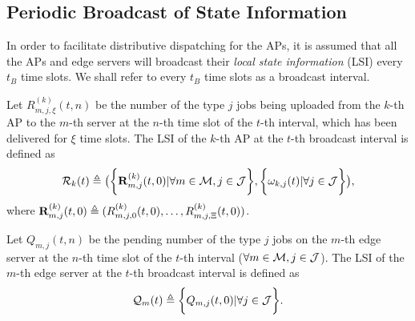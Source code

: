 \subsection{Periodic Broadcast of State Information}
\label{subsec:broadcast}
In order to facilitate distributive dispatching for the APs, it is assumed that all the APs and edge servers will broadcast their \emph{local state information} (LSI) every $t_B$ time slots.
We shall refer to every $t_B$ time slots as a broadcast interval.

\begin{definition}
    Let $R^{(k)}_{m,j,\xi}(t,n)$ be the number of the type $j$ jobs being uploaded from the $k$-th AP to the $m$-th server at the $n$-th time slot of the $t$-th interval, which has been delivered for $\xi$ time slots. 
    The LSI of the $k$-th AP at the $t$-th broadcast interval is defined as
    \begin{align}
        \mathcal{R}_{k}(t) \triangleq
        \big(
            \bigg\{\mathbf{R}^{(k)}_{m,j}(t,0) | \forall m\in\mathcal{M},j\in\mathcal{J}\bigg\},
            \bigg\{\omega_{k,j}(t) | \forall j\in\mathcal{J}\bigg\}
        \big),
    \end{align}
    where
    $\mathbf{R}^{(k)}_{m,j}(t,0) \triangleq ( R^{(k)}_{m,j,0}(t,0), \dots, R^{(k)}_{m,j,\Xi}(t,0) )$.
\end{definition}

\begin{definition}
    Let $Q_{m,j}({t,n})$ be the pending number of the type $j$ jobs on the $m$-th edge server at the $n$-th time slot of the $t$-th interval ($\forall m\in\mathcal{M}, j\in\mathcal{J}$).
    The LSI of the $m$-th edge server at the $t$-th broadcast interval is defined as
    \begin{align}
        \mathcal{Q}_{m}(t) \triangleq \bigg\{
            Q_{m,j}(t, 0) | \forall j\in\mathcal{J}
        \bigg\}.
    \end{align}
\end{definition}

